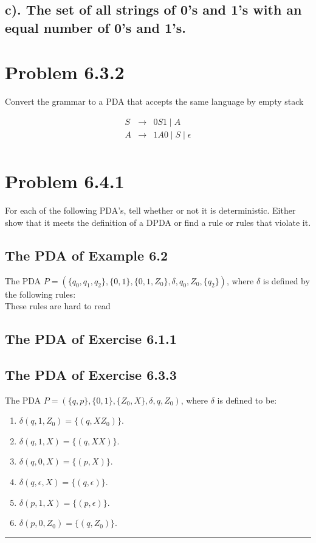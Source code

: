 \documentclass[20pt]{article} %
\begin{document}
\subsection{c). The set of all strings of 0's and 1's with an equal number of 0's and 1's.}
\section{Problem 6.3.2}
Convert the grammar to a PDA that accepts the same language by empty stack
 \begin{table}
 \[\begin{array}{ccc} 
 S & \rightarrow & 0S1 \mid A \\
 A & \rightarrow & 1A0 \mid S \mid \epsilon \\
 \end{array}\]
 \end{table}
\section{Problem 6.4.1}
For each of the following PDA's, tell whether or not it is deterministic.  Either show that it meets the definition of a DPDA or find a rule or rules that violate it.
\subsection{The PDA of Example 6.2}
The PDA $\!P = (\{q_0, q_1, q_2\}, \{0,1\}, \{0,1,Z_0\}, \delta, q_0, Z_0, \{q_2\})$, where $\delta$ is defined by the following rules: \\ These rules are hard to read
\subsection{The PDA of Exercise 6.1.1}

\subsection{The PDA of Exercise 6.3.3}
The PDA $\!P = (\{q, p\}, \{0,1\}, \{Z_0,X\}, \delta, q , Z_0)$, where  $\delta$ is defined to be:
\begin{enumerate}
\item $\delta(q, 1, Z_0) = \{(q, XZ_0)\}$.
\item $\delta(q, 1, X) = \{(q, XX)\}$.
\item $\delta(q, 0, X) = \{(p, X)\}$.
\item $\delta(q, \epsilon, X) = \{(q, \epsilon)\}$.
\item $\delta(p, 1, X) = \{(p, \epsilon)\}$.
\item $\delta(p, 0, Z_0) = \{(q, Z_0)\}$.
\end{enumerate}
\noindent\rule{2cm}{0.4pt} \\
\end{document}
